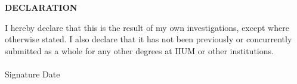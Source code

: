 \documentclass[12pt, a4paper]{memoir}
\begin{document}
\thispagestyle{empty}


\begin{center}
\fontsize{14bp}{16bp}
\textbf{\MakeUppercase{Declaration}}\\[24bp]
\end{center}


\noindent I hereby declare that this \myDocument is the result of my own 
investigations, 
except where otherwise stated. I also declare that it has not been previously 
or concurrently submitted as a whole for any other degrees at IIUM or other 
institutions.\\[24pt]

\noindent\myName\\[24pt]

\noindent Signature \makebox[2in]{\dotfill}
\hfill
\noindent Date \makebox[1.5in]{\dotfill}
\end{document}
